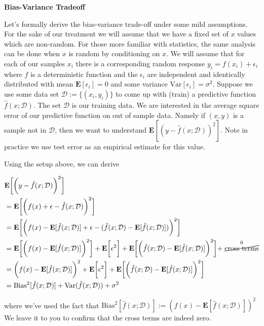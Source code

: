 \item {\bf Bias-Variance Tradeoff}

Let's formally derive the bias-variance trade-off under some mild assumptions. For the sake of our treatment we will assume that we have a fixed set of $x$ values which are non-random. For those more familiar with statistics, the same analysis can be done when $x$ is random by conditioning on $x$. We will assume that for each of our samples $x_i$ there is a corresponding random response $y_i  = f(x_i) + \epsilon_i$ where $f$ is a deterministic function and the $\epsilon_i$ are independent and identically distributed with mean $\textbf{E}[\epsilon_i] = 0$ and some variance $\mathrm{Var}[\epsilon_i] = \sigma^2$. Suppose we use some data set $\mathcal{D} := \{(x_i, y_i)\}$ to come up with (train) a predictive function $\hat{f}(x;\mathcal{D})$. The set $\mathcal{D}$ is our training data. We are interested in the average square error of our predictive function on out of sample data. Namely if $(x, y)$ is a sample not in $\mathcal{D}$, then we want to understand $\textbf{E}[(y - \hat{f}(x;\mathcal{D}))^2]$. Note in practice we use test error as an empirical estimate for this value. \newline

Using the setup above, we can derive


\begin{align*}
&\textbf{E}\bigg[\bigg(y - \hat{f}(x;\mathcal{D})\bigg)^2\bigg]\\
&= \textbf{E}\bigg[\bigg(f(x) + \epsilon - \hat{f}(x;\mathcal{D})\bigg)^2\bigg]\\
&= \textbf{E}\bigg[\bigg(f(x) - \textbf{E}[\hat{f}(x;\mathcal{D})] + \epsilon - ( \hat{f}(x;\mathcal{D}) - \textbf{E}[\hat{f}(x;\mathcal{D})])  \bigg)^2\bigg]\\
&= \textbf{E}\bigg[\bigg(f(x) - \textbf{E}[\hat{f}(x;\mathcal{D})]\bigg)^2\bigg] + \textbf{E}\bigg[\epsilon^2\bigg] + \textbf{E} \bigg[\bigg(  \hat{f}(x;\mathcal{D}) - \textbf{E}[\hat{f}(x;\mathcal{D})] \bigg)^2 \bigg] + \stackrel{0}{\cancel{\textrm{cross terms}}}\\
&= \bigg(f(x) - \textbf{E}[\hat{f}(x;\mathcal{D})]\bigg)^2 + \textbf{E}\bigg[\epsilon^2\bigg] + \textbf{E} \bigg[\bigg(  \hat{f}(x;\mathcal{D}) - \textbf{E}[\hat{f}(x;\mathcal{D})] \bigg)^2 \bigg] \\
&= \textrm{Bias}^2[\hat{f}(x;\mathcal{D})] + \mathrm{Var}(\hat{f}(x;\mathcal{D})) + \sigma^2
\end{align*}

where we've used the fact that $\textrm{Bias}^2[\hat{f}(x;\mathcal{D})] := (f(x) - \textbf{E}[\hat{f}(x;\mathcal{D})])^2 $ We leave it to you to confirm that the cross terms are indeed zero. \newline

